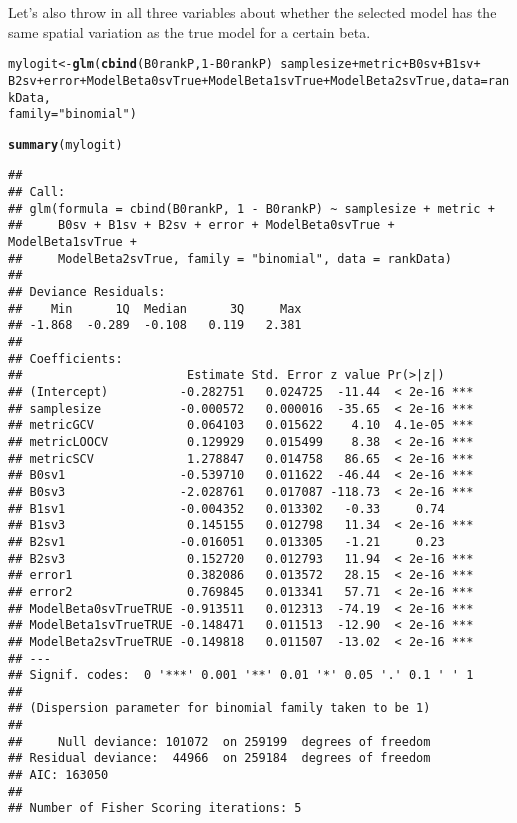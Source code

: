 \documentclass{article}\usepackage[]{graphicx}\usepackage[]{color}
\makeatletter
\newcommand{\hlnum}[1]{\textcolor[rgb]{0.686,0.059,0.569}{#1}}%
\newcommand{\hlstr}[1]{\textcolor[rgb]{0.192,0.494,0.8}{#1}}%
\newcommand{\hlopt}[1]{\textcolor[rgb]{0,0,0}{#1}}%
\newcommand{\hlstd}[1]{\textcolor[rgb]{0.345,0.345,0.345}{#1}}%
\newcommand{\hlkwb}[1]{\textcolor[rgb]{0.69,0.353,0.396}{#1}}%
\newcommand{\hlkwc}[1]{\textcolor[rgb]{0.333,0.667,0.333}{#1}}%
\newcommand{\hlkwd}[1]{\textcolor[rgb]{0.737,0.353,0.396}{\textbf{#1}}}%
\newenvironment{kframe}{%
 \def\at@end@of@kframe{}%
 \ifinner\ifhmode%
  \def\at@end@of@kframe{\end{minipage}}%
  \begin{minipage}{\columnwidth}%
 \fi\fi%
 \def\FrameCommand##1{\hskip\@totalleftmargin \hskip-\fboxsep
 \colorbox{shadecolor}{##1}\hskip-\fboxsep
     \hskip-\linewidth \hskip-\@totalleftmargin \hskip\columnwidth}%
 \MakeFramed {\advance\hsize-\width
   \@totalleftmargin\z@ \linewidth\hsize
   \@setminipage}}%
 {\par\unskip\endMakeFramed%
 \at@end@of@kframe}
\newenvironment{knitrout}{}{} %
\makeatother
\begin{document}
Let's also throw in all three variables about whether the selected model has the same spatial variation as the true model for a certain beta.

\begin{knitrout}
\color{fgcolor}\begin{kframe}
\begin{alltt}
\hlstd{mylogit} \hlkwb{<-} \hlkwd{glm}\hlstd{(}\hlkwd{cbind}\hlstd{(B0rankP,} \hlnum{1} \hlopt{-} \hlstd{B0rankP)} \hlopt{~} \hlstd{samplesize} \hlopt{+} \hlstd{metric} \hlopt{+} \hlstd{B0sv} \hlopt{+} \hlstd{B1sv} \hlopt{+}
    \hlstd{B2sv} \hlopt{+} \hlstd{error} \hlopt{+} \hlstd{ModelBeta0svTrue} \hlopt{+} \hlstd{ModelBeta1svTrue} \hlopt{+} \hlstd{ModelBeta2svTrue,} \hlkwc{data} \hlstd{= rankData,}
    \hlkwc{family} \hlstd{=} \hlstr{"binomial"}\hlstd{)}
\end{alltt}


{\ttfamily\noindent\color{warningcolor}{\#\# Warning: non-integer counts in a binomial glm!}}\begin{alltt}
\hlkwd{summary}\hlstd{(mylogit)}
\end{alltt}
\begin{verbatim}
## 
## Call:
## glm(formula = cbind(B0rankP, 1 - B0rankP) ~ samplesize + metric + 
##     B0sv + B1sv + B2sv + error + ModelBeta0svTrue + ModelBeta1svTrue + 
##     ModelBeta2svTrue, family = "binomial", data = rankData)
## 
## Deviance Residuals: 
##    Min      1Q  Median      3Q     Max  
## -1.868  -0.289  -0.108   0.119   2.381  
## 
## Coefficients:
##                       Estimate Std. Error z value Pr(>|z|)    
## (Intercept)          -0.282751   0.024725  -11.44  < 2e-16 ***
## samplesize           -0.000572   0.000016  -35.65  < 2e-16 ***
## metricGCV             0.064103   0.015622    4.10  4.1e-05 ***
## metricLOOCV           0.129929   0.015499    8.38  < 2e-16 ***
## metricSCV             1.278847   0.014758   86.65  < 2e-16 ***
## B0sv1                -0.539710   0.011622  -46.44  < 2e-16 ***
## B0sv3                -2.028761   0.017087 -118.73  < 2e-16 ***
## B1sv1                -0.004352   0.013302   -0.33     0.74    
## B1sv3                 0.145155   0.012798   11.34  < 2e-16 ***
## B2sv1                -0.016051   0.013305   -1.21     0.23    
## B2sv3                 0.152720   0.012793   11.94  < 2e-16 ***
## error1                0.382086   0.013572   28.15  < 2e-16 ***
## error2                0.769845   0.013341   57.71  < 2e-16 ***
## ModelBeta0svTrueTRUE -0.913511   0.012313  -74.19  < 2e-16 ***
## ModelBeta1svTrueTRUE -0.148471   0.011513  -12.90  < 2e-16 ***
## ModelBeta2svTrueTRUE -0.149818   0.011507  -13.02  < 2e-16 ***
## ---
## Signif. codes:  0 '***' 0.001 '**' 0.01 '*' 0.05 '.' 0.1 ' ' 1
## 
## (Dispersion parameter for binomial family taken to be 1)
## 
##     Null deviance: 101072  on 259199  degrees of freedom
## Residual deviance:  44966  on 259184  degrees of freedom
## AIC: 163050
## 
## Number of Fisher Scoring iterations: 5
\end{verbatim}
\end{kframe}
\end{knitrout}
\end{document}
